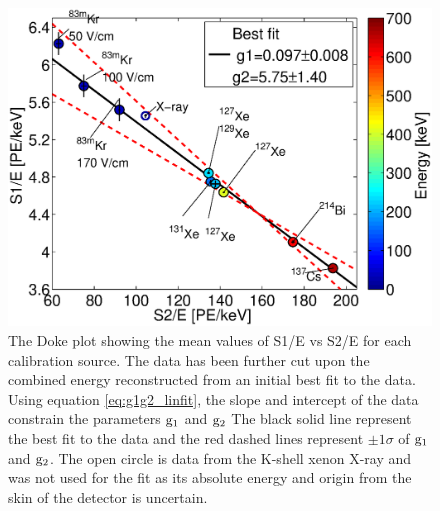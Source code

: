\renewcommand{\baselinestretch}{1}
\small\normalsize
 \begin{figure}[h!]\centering
\includegraphics[width=130mm]{Chapter_E_Scale/Figures/Doke_new/S1S2_Doke_3.eps}
\caption{The Doke plot showing the mean values of S1/E vs S2/E for each calibration source. The data has been further cut upon the combined energy reconstructed from an initial best fit to the data. Using equation \ref{eq:g1g2_linfit}, the slope and intercept of the data constrain the parameters $\rm g_1$ and $\rm g_2$ The black solid line represent the best fit to the data and the red dashed lines represent $\pm 1\sigma$ of $\rm g_1$ and $\rm g_2$. The open circle is data from the K-shell xenon X-ray and was not used for the fit as its absolute energy and origin from the skin of the detector is uncertain.}
\label{fig:Doke2}
\end{figure}
\renewcommand{\baselinestretch}{2}
\small\normalsize

